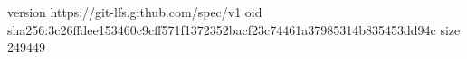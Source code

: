 version https://git-lfs.github.com/spec/v1
oid sha256:3c26ffdee153460c9cff571f1372352bacf23c74461a37985314b835453dd94c
size 249449
